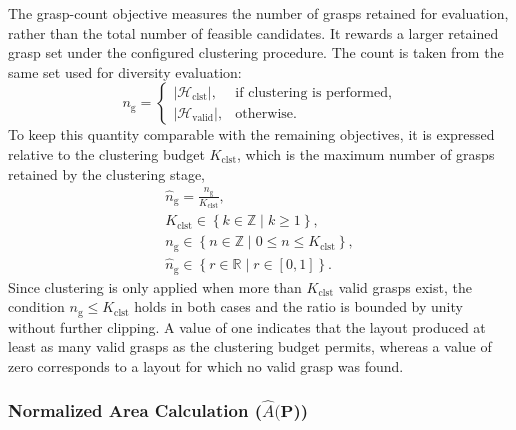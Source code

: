     The grasp-count objective measures the number of grasps retained for
    evaluation, rather than the total number of feasible candidates.
    It rewards a larger retained grasp set under the configured clustering
    procedure. The count is taken from the same set used for diversity
    evaluation:
    \begin{equation}
        n_{\mathrm{g}} =
        \begin{cases}
            |\mathcal{H}_{\mathrm{clst}}|,  & \text{if clustering is performed},\\[2pt]
            |\mathcal{H}_{\mathrm{valid}}|, & \text{otherwise}.
        \end{cases}
    \end{equation}
    To keep this quantity comparable with the remaining objectives, it is expressed relative to the
    clustering budget $K_{\mathrm{clst}}$, which is the maximum number of
    grasps retained by the clustering stage,
\begin{equation}
    \label{eq:grasp_count_norm}
    \begin{gathered}
        \hat{n}_{\mathrm{g}} = \frac{n_{\mathrm{g}}}{K_{\mathrm{clst}}},
        \\[4pt]
        K_{\mathrm{clst}} \in \left\{ k \in \mathbb{Z} \mid k \ge 1 \right\},
        \\[2pt]
        n_{\mathrm{g}} \in \left\{ n \in \mathbb{Z} \mid 0 \le n \le K_{\mathrm{clst}} \right\},
        \\[2pt]
        \hat{n}_{\mathrm{g}} \in \left\{ r \in \mathbb{R} \mid r \in [0,1] \right\}.
    \end{gathered}
\end{equation}
    Since clustering is only applied when more than $K_{\mathrm{clst}}$ valid grasps exist, the
    condition $n_{\mathrm{g}} \leq K_{\mathrm{clst}}$ holds in both cases and the ratio is bounded
    by unity without further clipping. A value of one indicates that the layout produced at least as
    many valid grasps as the clustering budget permits, whereas a value of zero corresponds to a
    layout for which no valid grasp was found.
    

    \subsubsection{Normalized Area Calculation ($\hat{A}(\mathbf{P}$))}

